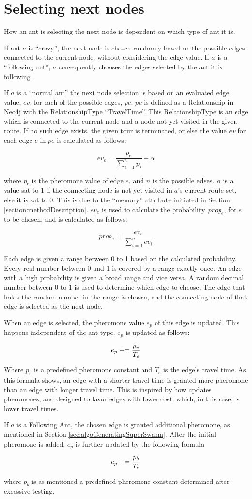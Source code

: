 \section{Selecting next nodes}
\label{sec:selectingNextNode}

How an ant is selecting the next node is dependent on which type of ant it is. 

If ant $a$ is ``crazy'', the next node is chosen randomly based on the possible edges connected to the current node, without considering the edge value. If $a$ is a ``following ant'', $a$ consequently chooses the edges selected by the ant it is following.  

If $a$ is a ``normal ant'' the next node selection is based on an evaluated edge value, $ev$, for each of the possible edges, $pe$. $pe$ is defined as a Relationship in Neo4j with the RelationshipType ``TravelTime''.  
This RelationshipType is an edge which is connected to the current node and a node not yet visited in the given route. If no such edge exists, the given tour is terminated, or else the value $ev$ for each edge $e$ in $pe$ is calculated as follows: 

$$ev_e = \frac{p_e}{\sum\limits^{n}_{i=1}p_i} + \alpha $$

where $p_e$ is the pheromone value of edge $e$, and $n$ is the possible edges. $\alpha$ is a value sat to 1 if the connecting node is not yet visited in $a$'s current route set, else it is sat to 0. This is due to the ``memory'' attribute initiated in Section \vref{section:methodDescription}. $ev_e$ is used to calculate the probability, $prop_e$, for $e$ to be chosen, and is calculated as follows:

$$prob_e = \frac{ev_e}{\sum\limits^{n}_{i=1}ev_i}$$

Each edge is given a range between 0 to 1 based on the calculated probability. Every real number between 0 and 1 is covered by a range exactly once. An edge with a high probability is given a broad range and vice versa. A random decimal number between 0 to 1 is used to determine which edge to choose. The edge that holds the random number in the range is chosen, and the connecting node of that edge is selected as the next node. 

When an edge is selected, the pheromone value $e_p$ of this edge is updated. This happens independent of the ant type. $e_p$ is updated as follows:

$$e_p \mathrel{+}= \frac{p_v}{T_e}$$ 

Where $p_v$ is a predefined pheromone constant and $T_e$ is the edge's travel time. As this formula shows, an edge with a shorter travel time is granted more pheromone than an edge with longer travel time. This is inspired by how \citet{hsiao04} updates pheromones, and designed to favor edges with lower cost, which, in this case, is lower travel times. 

If $a$ is a Following Ant, the chosen edge is granted additional pheromone, as mentioned in Section \vref{sec:algoGeneratingSuperSwarm}. After the initial pheromone is added, $e_p$ is further updated by the following formula:

$$e_p \mathrel{+}= \frac{p_b}{T_e}$$ 

where $p_b$ is as mentioned a predefined pheromone constant determined after excessive testing.
